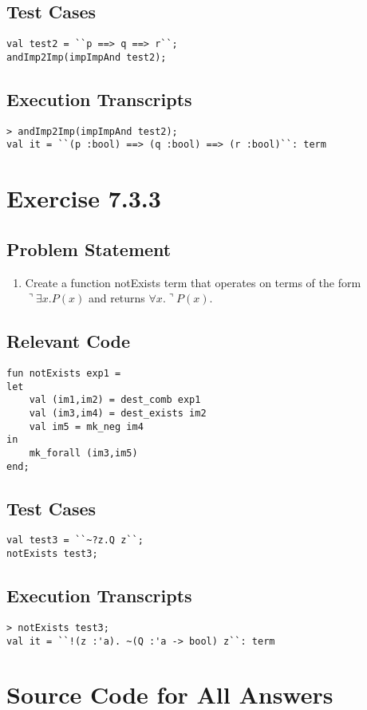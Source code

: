 \documentclass[twoside]{report}
\begin{document}
\section{Test Cases}
\begin{scriptsize}
    \begin{verbatim}
val test2 = ``p ==> q ==> r``;
andImp2Imp(impImpAnd test2);
    \end{verbatim}
\end{scriptsize}
\section{Execution Transcripts}
\begin{scriptsize}
    \begin{verbatim}
> andImp2Imp(impImpAnd test2);
val it = ``(p :bool) ==> (q :bool) ==> (r :bool)``: term
    \end{verbatim}
\end{scriptsize}


\chapter{Exercise 7.3.3}
\label{cha:7-3-3}
\section{Problem Statement}
\begin{enumerate}
    \item Create a function notExists term that operates on terms of the form $\urcorner \exists x.P(x)$ and returns $\forall x. \urcorner P(x)$.
\end{enumerate}
\section{Relevant Code}
    \begin{lstlisting}[frame=trBL]
fun notExists exp1 = 
let
	val (im1,im2) = dest_comb exp1
	val (im3,im4) = dest_exists im2
	val im5 = mk_neg im4
in
	mk_forall (im3,im5)
end;
    \end{lstlisting}
\section{Test Cases}
\begin{scriptsize}
    \begin{verbatim}
val test3 = ``~?z.Q z``;
notExists test3;
    \end{verbatim}
\end{scriptsize}
\section{Execution Transcripts}
\begin{scriptsize}
    \begin{verbatim}
> notExists test3;
val it = ``!(z :'a). ~(Q :'a -> bool) z``: term
    \end{verbatim}
\end{scriptsize}


\appendix{}
\chapter{Source Code for All Answers}
\label{cha:apdx-a}

\end{document}
